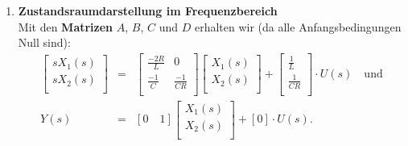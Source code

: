 {\begin{enumerate}
 \item[]{\bf Zustandsraumdarstellung im Frequenzbereich}\\
Mit den {\bf Matrizen}  {\boldmath $A$, $B$, $C$} und  {\boldmath $D$} erhalten wir (da alle Anfangsbedingungen Null sind):
\begin{eqnarray*}
\left [
\begin{array}{c}
 sX_1(s) \\
 sX_2(s) \\
\end{array}
\right ]
&=&\left [
\begin{array}{cc}
 \frac{-2R}{L} & 0\\
\frac{-1}{C} & \frac{-1}{CR}\\
\end{array}
\right ]
\left [
\begin{array}{c}
 X_1(s) \\
 X_2(s) \\
\end{array}
\right ]+
\left [
 \begin{array}{c}
  \frac{1}{L} \\
 \frac{1}{CR} \\
\end{array}
\right ] \cdot U(s) \quad\text{und}\\ 
Y(s)&=&
 [ 0 \quad 1]\left [
\begin{array}{c}
 X_1(s) \\
 X_2(s) \\
\end{array}
\right ]+[0]\cdot U(s). 
\end{eqnarray*}



\end{enumerate}}
